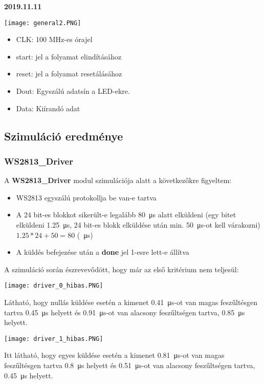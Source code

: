 \documentclass[10pt]{article} %
\begin{document}
\textbf{2019.11.11}

\texttt{[image: general2.PNG]}

\begin{itemize}
\item CLK: 100 MHz-es órajel
\item start: jel a folyamat elindításához
\item reset: jel a folyamat resetálásához
\item Dout: Egyszálú adatsín a LED-ekre.
\item Data: Kiírandó adat
\end{itemize}

\subsection{Szimuláció eredménye}

\subsubsection{WS2813\_Driver}

A \textbf{WS2813\_Driver} modul szimulációja alatt a következőkre figyeltem:
\begin{itemize}
	\item WS2813 egyszálú protokollja be van-e tartva
	\item A 24 bit-es blokkot sikerült-e legalább \SI{80}{\micro\second} alatt elküldeni (egy bitet elküldeni \SI{1.25}{\micro\second}, 24 bit-es blokk elküldése után min. \SI{50}{\micro\second}-ot kell várakozni) $1.25 * 24 + 50 = 80$ (\SI{}{\micro\second})
	\item A küldés befejezése után a \textbf{done} jel 1-esre lett-e állítva
\end{itemize}

A szimuláció során észrevevődött, hogy már az első kritérium nem teljesül:

\texttt{[image: driver\_0\_hibas.PNG]}

Látható, hogy nullás küldése esetén a kimenet \SI{0.41}{\micro\second}-ot van magas feszűltésgen tartva \SI{0.45}{\micro\second} helyett és \SI{0.91}{\micro\second}-ot van
alacsony feszűltségen tartva, \SI{0.85}{\micro\second} helyett.

\texttt{[image: driver\_1\_hibas.PNG]}

Itt látható, hogy egyes küldése esetén a kimenet \SI{0.81}{\micro\second}-ot van magas feszűltésgen tartva \SI{0.8}{\micro\second} helyett és \SI{0.51}{\micro\second}-ot van
alacsony feszűltségen tartva, \SI{0.45}{\micro\second} helyett.
\end{document}
